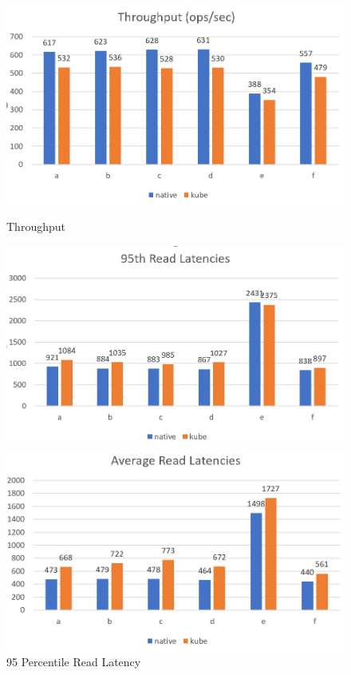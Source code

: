 \documentclass[sigconf]{acmart}
\begin{document}
\begin{figure}[ht] 
  \label{mongo} 
  \begin{minipage}[b]{0.45\linewidth}
    \centering
    \includegraphics[width=.8\linewidth]{figures/throughput.png} 
    \caption{Throughput} 
    \vspace{4ex}
  \end{minipage}%
  \begin{minipage}[b]{0.45\linewidth}
    \centering
    \includegraphics[width=.8\linewidth]{figures/95th.png} 
    \caption{95 Percentile Read Latency} 
    \vspace{4ex}
  \end{minipage} 
  \begin{minipage}[b]{0.45\linewidth}
    \centering
    \includegraphics[width=.8\linewidth]{figures/average.png} 

\end{minipage}
\end{figure}
\end{document}
